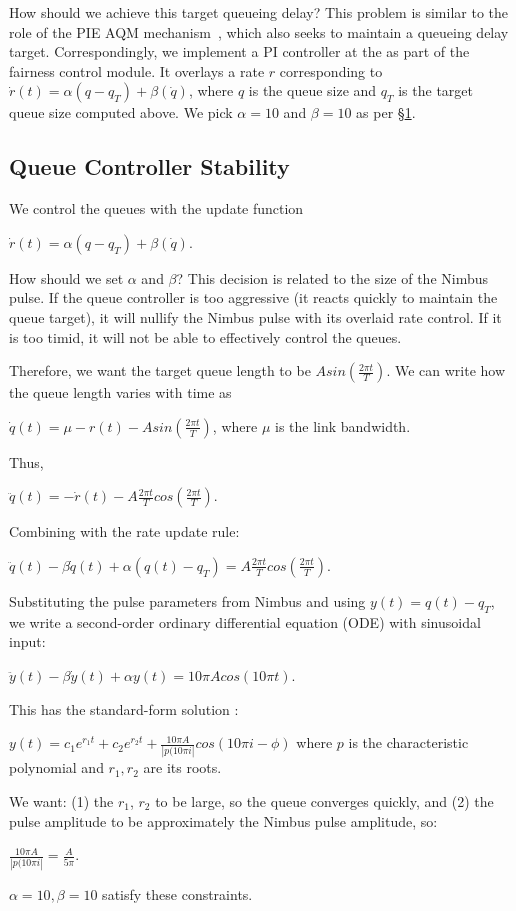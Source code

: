 How should we achieve this target queueing delay? 
This problem is similar to the role of the PIE AQM mechanism~\cite{pie}, which also seeks to maintain a queueing delay target.
Correspondingly, we implement a PI controller at the \inbox as part of the fairness control module. 
It overlays a rate $r$ corresponding to $\dot{r}(t) = \alpha (q - q_T) + \beta (\dot{q})$, where $q$ is the queue size and $q_T$ is the target queue size computed above.
We pick $\alpha = 10$ and $\beta = 10$ as per \S\ref{s:qctl:pi}.

\begin{Appendix}
\section{Queue Controller Stability}\label{s:qctl:pi}

We control the queues with the update function 
    
    $\dot{r}(t) = \alpha (q - q_T) + \beta (\dot{q})$.

How should we set $\alpha$ and $\beta$? This decision is related to the size of the Nimbus pulse. 
If the queue controller is too aggressive (\ie it reacts quickly to maintain the queue target), it will nullify the Nimbus pulse with its overlaid rate control.
If it is too timid, it will not be able to effectively control the queues.

Therefore, we want the target queue length to be $A sin(\frac{2\pi{}t}{T})$. 
We can write how the queue length varies with time as 
    
    $\dot{q}(t) = \mu - r(t) - A sin(\frac{2\pi{}t}{T})$, where $\mu$ is the link bandwidth.

\noindent Thus, 
    
    $\ddot{q}(t) = - \dot{r}(t) - A \frac{2\pi{}t}{T} cos(\frac{2\pi{}t}{T})$.

\noindent Combining with the rate update rule:

$\ddot{q}(t) - \beta \dot{q}(t) + \alpha (q(t) - q_T) = A \frac{2\pi{}t}{T} cos(\frac{2\pi{}t}{T})$.

\noindent Substituting the pulse parameters from Nimbus and using $y(t) = q(t) - q_T$, we write a second-order ordinary differential equation (ODE) with sinusoidal input:

$\ddot{y}(t) - \beta \dot{y}(t) + \alpha y(t) = 10\pi{}A cos(10\pi{}t)$.

    \noindent This has the standard-form solution :

$y(t) = c_1 e^{r_1 t} + c_2 e^{r_2 t} + \frac{10\pi{}A}{|p(10\pi{}i|} cos(10\pi{}i - \phi)$ where $p$ is the characteristic polynomial and $r_1, r_2$ are its roots.

\noindent We want: (1) the $r_1$, $r_2$ to be large, so the queue converges quickly, and (2) the pulse amplitude to be approximately the Nimbus pulse amplitude, so:

$\frac{10\pi{}A}{|p(10\pi{}i|} = \frac{A}{5\pi}$.

$\alpha = 10, \beta = 10$ satisfy these constraints.
\end{Appendix}

